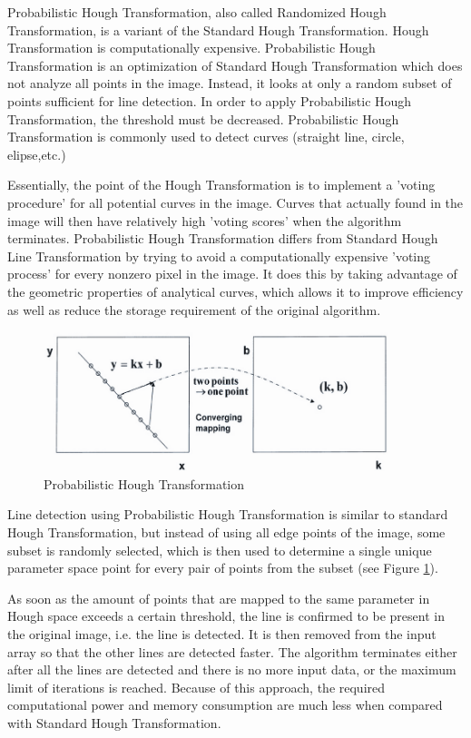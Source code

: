 Probabilistic Hough Transformation, also called Randomized Hough Transformation, is a variant of the Standard Hough Transformation. Hough Transformation is computationally expensive. Probabilistic Hough Transformation is an optimization of Standard Hough Transformation which does not analyze all points in the image. Instead, it looks at only a random subset of points sufficient for line detection. In order to apply Probabilistic Hough Transformation, the threshold must be decreased. Probabilistic Hough Transformation is commonly used to detect curves (straight line, circle, elipse,etc.) 




Essentially, the point of the Hough Transformation is to implement a 'voting procedure' for all potential curves in the image. Curves that actually found in the image will then have relatively high 'voting scores' when the algorithm terminates. Probabilistic Hough Transformation differs from Standard Hough Line Transformation by trying to avoid a computationally expensive 'voting process' for every nonzero pixel in the image. It does this by taking advantage of the geometric properties of analytical curves, which allows it to improve efficiency as well as reduce the storage requirement of the original algorithm.


 \begin{figure}[H]
 \centering
  \includegraphics[width=0.9\textwidth]{./Bilder/Probabilistic_HT.png}
  \caption{Probabilistic Hough Transformation}
  \label{Probabilistic_HT_fig}
\end{figure}

Line detection using Probabilistic Hough Transformation is similar to standard Hough Transformation, but instead of using all edge points of the image, some subset is randomly selected, which is then used to determine a single unique parameter space point for every pair of points from the subset (see Figure \ref{Probabilistic_HT_fig}).

As soon as the amount of points that are mapped to the same parameter in Hough space exceeds a certain threshold, the line is confirmed to be present in the original image, i.e. the line is detected. It is then removed from the input array so that the other lines are detected faster. The algorithm terminates either after all the lines are detected and there is no more input data, or the maximum limit of iterations is reached. Because of this approach, the required computational power and memory consumption are much less when compared with Standard Hough Transformation.


